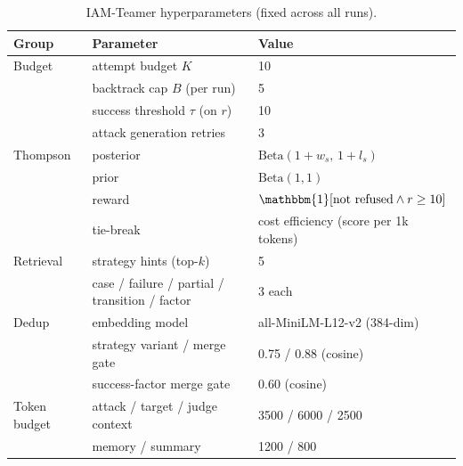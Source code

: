 \documentclass[11pt]{article}
\begin{document}
\begin{table}[htbp]
  \centering
  \caption{IAM-Teamer hyperparameters (fixed across all runs).}
  \label{tab:hyperparams}
  \footnotesize
  \begin{tabular}{@{}lll@{}}
    \toprule
    \textbf{Group} & \textbf{Parameter}                             & \textbf{Value}                                    \\
    \midrule
    Budget         & attempt budget $K$                             & 10                                                \\
                   & backtrack cap $B$ (per run)                    & 5                                                 \\
                   & success threshold $\tau$ (on $r$)              & 10                                                \\
                   & attack generation retries                      & 3                                                 \\
    \midrule
    Thompson       & posterior                                      & $\text{Beta}(1+w_s,\,1+l_s)$                      \\
                   & prior                                          & $\text{Beta}(1,1)$                                \\
                   & reward                                         & $\mathbbm{1}[\text{not refused} \wedge r \ge 10]$ \\
                   & tie-break                                      & cost efficiency (score per 1k tokens)             \\
    \midrule
    Retrieval      & strategy hints (top-$k$)                       & 5                                                 \\
                   & case / failure / partial / transition / factor & 3 each                                            \\
    \midrule
    Dedup          & embedding model                                & all-MiniLM-L12-v2 (384-dim)                       \\
                   & strategy variant / merge gate                  & 0.75 / 0.88 (cosine)                              \\
                   & success-factor merge gate                      & 0.60 (cosine)                                     \\
    \midrule
    Token budget   & attack / target / judge context                & 3500 / 6000 / 2500                                \\
                   & memory / summary                               & 1200 / 800                                        \\
    \bottomrule
  \end{tabular}
\end{table}
\end{document}
